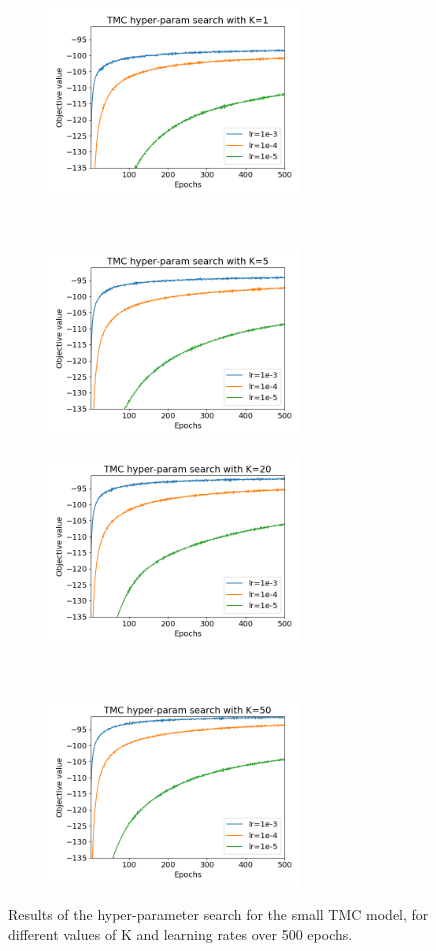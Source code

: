 \documentclass{article}
\begin{document}
\begin{figure}[th!]
    \centering
    \begin{subfigure}[t]{0.5\textwidth}
    \hspace*{-2cm}
        \centering
        \includegraphics[height=5cm]{Figures/hp_s_1.png}
    \end{subfigure}%
    ~ 
    \begin{subfigure}[t]{0.5\textwidth}
        \centering
        \includegraphics[height=5cm]{Figures/hp_s_5.png}
    \end{subfigure}
        \begin{subfigure}[t]{0.5\textwidth}
    \hspace*{-2cm}
        \centering
        \includegraphics[height=5cm]{Figures/hp_s_20.png}
    \end{subfigure}%
    ~ 
    \begin{subfigure}[t]{0.5\textwidth}
        \centering
        \includegraphics[height=5cm]{Figures/hp_s_50.png}
    \end{subfigure}
    \caption{Results of the hyper-parameter search for the small TMC model, for different values of K and learning rates over 500 epochs.}
    \label{fig:hp_search}
\end{figure}
\end{document}

